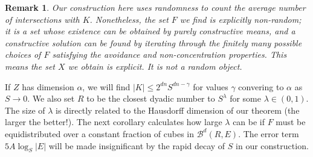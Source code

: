 \documentclass[usenames,dvipsnames]{article}
\theoremstyle{plain}
\theoremstyle{plain}
\newtheorem*{remark}{Remark}
\begin{document}
\begin{remark}
	Our construction here uses randomness to count the average number of intersections with $K$. Nonetheless, the set $F$ we find is explicitly non-random; it is a set whose existence can be obtained by purely constructive means, and a constructive solution can be found by iterating through the finitely many possible choices of $F$ satisfying the avoidance and non-concentration properties. This means the set $X$ we obtain is explicit. It is not a random object.
\end{remark}

If $Z$ has dimension $\alpha$, we will find $|K| \leq 2^{dn} S^{dn-\gamma}$ for values $\gamma$ convering to $\alpha$ as $S \to 0$. We also set $R$ to be the closest dyadic number to $S^\lambda$ for some $\lambda \in (0,1)$. The size of $\lambda$ is directly related to the Hausdorff dimension of our theorem (the larger the better!). The next corollary calculates how large $\lambda$ can be if $F$ must be equidistributed over a constant fraction of cubes in $\mathcal{B}^d(R,E)$. The error term $5A \log_S |E|$ will be made insignificant by the rapid decay of $S$ in our construction.
\end{document}
